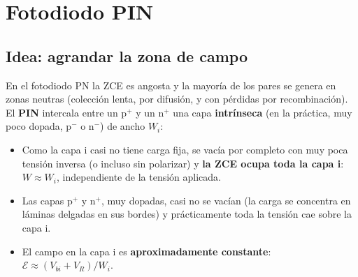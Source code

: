 \section{Fotodiodo PIN}
\label{sec:pin}

\subsection{Idea: agrandar la zona de campo}

En el fotodiodo PN la ZCE es angosta y la mayoría de los pares se genera en zonas neutras
(colección lenta, por difusión, y con pérdidas por recombinación). El \textbf{PIN} intercala
entre un p$^+$ y un n$^+$ una capa \textbf{intrínseca} (en la práctica, muy poco dopada,
p$^-$ o n$^-$) de ancho $W_i$:

\begin{itemize}
  \item Como la capa i casi no tiene carga fija, se vacía por completo con muy poca tensión
  inversa (o incluso sin polarizar) y \textbf{la ZCE ocupa toda la capa i}: $W\approx W_i$,
  independiente de la tensión aplicada.
  \item Las capas p$^+$ y n$^+$, muy dopadas, casi no se vacían (la carga se concentra en
  láminas delgadas en sus bordes) y prácticamente toda la tensión cae sobre la capa i.
  \item El campo en la capa i es \textbf{aproximadamente constante}: $\mathcal E\approx
  (V_{bi}+V_R)/W_i$.
\end{itemize}


